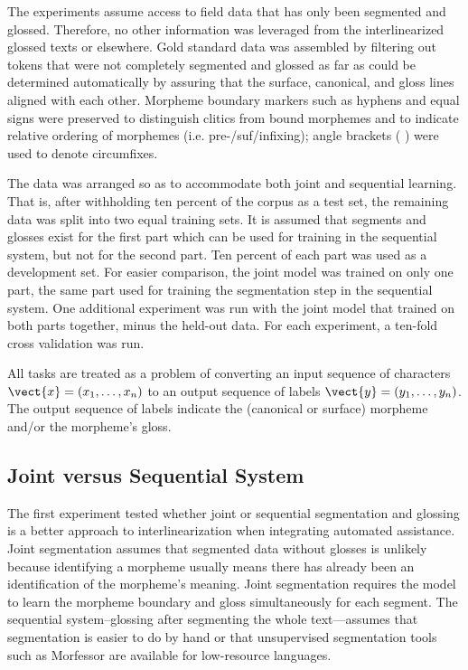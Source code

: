 The experiments assume access to field data that has only been segmented and glossed. Therefore, no other information was leveraged from the interlinearized glossed texts or elsewhere. Gold standard data was assembled by filtering out tokens that were not completely segmented and glossed as far as could be determined automatically by assuring that the surface, canonical, and gloss lines aligned with each other. 
Morpheme boundary markers such as hyphens and equal signs were preserved to distinguish clitics from bound morphemes and to indicate relative ordering of morphemes (i.e. pre-/suf/infixing); angle brackets (\textlangle{} \textrangle{}) were used to denote circumfixes. 

The data was arranged so as to accommodate both joint and sequential learning. That is, after withholding ten percent of the corpus as a test set, the remaining data was split into two equal training sets. It is assumed that segments and glosses exist for the first part which can be used for training in the sequential system, but not for the second part. Ten percent of each part was used as a development set. For easier comparison, the joint model was trained on only one part, the same part used for training the segmentation step in the sequential system. One additional experiment was run with the joint model that trained on both parts together, minus the held-out data. For each experiment, a ten-fold cross validation was run. 

All tasks are treated as a problem of converting an input sequence of characters $\vect{x} = (x_1, \ldots, x_n)$ to an output sequence of labels $\vect{y} = (y_1, \ldots, y_n)$. The output sequence of labels indicate the (canonical or surface) morpheme and/or the morpheme's gloss. 


\subsection{Joint versus Sequential System}
\label{sec:joint}

The first experiment tested whether joint or sequential segmentation and glossing is a better approach to interlinearization when integrating automated assistance. Joint segmentation assumes that segmented data without glosses is unlikely because identifying a morpheme usually means there has already been an identification of the morpheme's meaning.
Joint segmentation requires the model to learn the morpheme boundary and gloss simultaneously for each segment. The sequential system--glossing after segmenting the whole text---assumes that segmentation is easier to do by hand or that unsupervised segmentation tools such as Morfessor \citep{smit-etal-2014-morfessor} are available for low-resource languages. 

